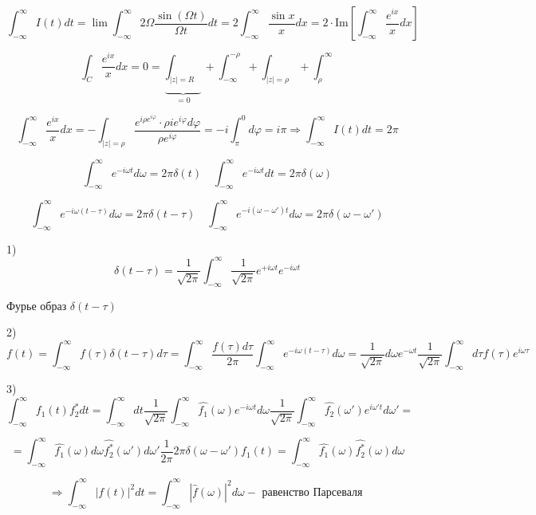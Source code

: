 \documentclass[12pt, a4paper]{report}
\begin{document}
\[ \int_{-\infty }^{\infty} I (t)dt =\lim \int_{-\infty}^{\infty} 2 \Omega \frac{\sin  ( \Omega t)}{\Omega t}dt = 2 \int_{- \infty }^{\infty} \frac{ \sin x}{x}dx = 2 \cdot \mathrm{Im} \left[ \int_{-\infty }^{\infty} \frac{e^{ix} }{x} dx \right]      \] 

\[ \int_{C} \frac{e^{ix} }{x} dx =0 = \underbrace{\int_{|z|= R}}_{=0}  + \int_{-\infty}^{-\rho} + \int_{|z|= \rho} + \int_{ \rho}^{\infty}       \] 

\[ \int_{-\infty}^{\infty} \frac{e^{ix} }{x} dx = - \int_{|z|=\rho} \frac{e^{i \rho e ^{i \varphi} } \cdot \rho i e^{ i \varphi} d \varphi }{\rho e^{i \varphi}} =- i \int_{\pi}^{0} d \varphi= i \pi \Rightarrow \int_{-\infty }^{\infty} I ( t)dt = 2\pi      \] 

\[ \int_{-\infty }^{\infty}  e^{- i \omega t} d \omega = 2 \pi \delta ( t) \quad \int_{-\infty}^{\infty} e ^{ - i \omega t }dt = 2 \pi \delta(\omega)  \]

\[ \int_{-\infty}^{\infty}   e^{- i \omega( t - \tau)} d \omega = 2 \pi \delta ( t - \tau )\quad  \int_{-\infty}^{\infty}    e^{-i (\omega- \omega ') t} d \omega = 2 \pi \delta ( \omega- \omega' )   \] 

1)\[  \delta ( t- \tau )= \frac{1}{ \sqrt{ 2 \pi }} \int_{-\infty}^{  \infty} \frac{1}{ \sqrt{2\pi }} e^{+i \omega t} e^{- i \omega t}  \] 

Фурье образ \( \delta ( t - \tau) \) 

2)\[ f(t)= \int_{-\infty}^{\infty} f(\tau ) \delta ( t - \tau)d \tau = \int_{-\infty}^{\infty} \frac{f(\tau)d \tau}{2 \pi} \int_{-\infty}^{\infty} e^{- i \omega ( t - \tau ) }d \omega = \frac{1}{ \sqrt{2 \pi}} d \omega e ^{- \omega t } \frac{1}{\sqrt{2 \pi}} \int_{-\infty}^{\infty} d \tau f( \tau) e^{i \omega \tau}       \] 

3) \[ \int_{-\infty}^{\infty}   f_1 ( t)f_2 ^{*}dt  = \int_{-\infty}^{\infty}   dt \frac{1}{\sqrt{2\pi}}\int_{-\infty}^{\infty} \hat{f_1 }(\omega)e ^{-i \omega t} d \omega \frac{1}{\sqrt{2 \pi}} \int _{-\infty}^{\infty} \hat{f_2 }(\omega') e^{i \omega' t} d \omega'    = \]

\[ = \int_{-\infty}^{\infty}    \hat{f_1} (\omega)d \omega \hat{f_2 ^{*} }(\omega') d \omega' \frac{1}{2 \pi} 2\pi \delta ( \omega -\omega') f_1(t)= \int_{-\infty }^{\infty}\hat{f_1 }(\omega) \hat{f_2 ^{*} }(\omega) d \omega  \]

\[ \Rightarrow \int_{-\infty}^{\infty} |f(t)| ^2 dt = \int  _{-\infty}^{\infty} |\hat{f}(\omega)| ^2 d \omega - \text{ равенство Парсеваля }   \] 
\end{document}
